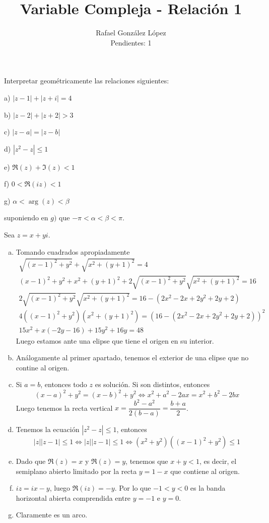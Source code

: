 \documentclass[twoside]{article}
\begin{document}
\title{Variable Compleja - Relación 1}
\author{Rafael González López\\
Pendientes: 1}
\maketitle

\begin{ejercicio}{1}
Interpretar geométricamente las relaciones siguientes:
  \begin{AutoMultiColItemize}
  \item[a)] $|z-1|+|z+i|=4$
  \item[b)] $|z-2|+|z+2|>3$
  \item[c)] $|z-a|=|z-b|$
  \item[d)] $|z^2-z|\leq 1$
  \item[e)] $\Re(z)+\Im(z)<1$
  \item[f)] $0<\Re(iz)<1$
  \item[g)] $\alpha < \arg(z) < \beta$
  \end{AutoMultiColItemize}
suponiendo en $g)$ que $-\pi<\alpha<\beta<\pi$. 
\end{ejercicio}
\begin{solucion}
Sea $z=x+yi$. 
\begin{enumerate}[a)]
\item Tomando cuadrados apropiadamente
\begin{gather*}
\sqrt{(x-1)^2+y^2}+\sqrt{x^2+(y+1)^2}=4\\
(x-1)^2+y^2 + x^2+(y+1)^2 + 2\sqrt{(x-1)^2+y^2}\sqrt{x^2+(y+1)^2} = 16\\
2\sqrt{(x-1)^2+y^2}\sqrt{x^2+(y+1)^2} = 16 - (2 x^2 - 2 x + 2 y^2 + 2 y + 2)\\
4((x-1)^2+y^2)(x^2+(y+1)^2) = (16 - (2 x^2 - 2 x + 2 y^2 + 2 y + 2))^2\\
15 x^2 + x (-2 y - 16) + 15 y^2 + 16 y = 48	
\end{gather*}
Luego estamos ante una elipse que tiene el origen en su interior.
\item Análogamente al primer apartado, tenemos el exterior de una elipse que no contine al origen.
\item Si $a=b$, entonces todo $z$ es solución. Si son distintos, entonces
$$
(x-a)^2+y^2 = (x-b)^2 +y^2  \Leftrightarrow x^2+a^2-2ax = x^2+b^2 -2bx 
$$
Luego tenemos la recta vertical $x = \dfrac{b^2-a^2}{2(b-a)}=\dfrac{b+a}{2}$.
\item Tenemos la ecuación $|z^2-z|\leq 1$, entonces
$$
|z||z-1|\leq 1 \Leftrightarrow |z||z-1| \leq 1 \Leftrightarrow (x^2+y^2)((x-1)^2+y^2) \leq 1
$$
\item Dado que $\Re(z)=x$ y $\Re(z)=y$, tenemos que $x+y<1$, es decir, el semiplano abierto limitado por la recta $y=1-x$ que contiene al origen.
\item $iz= ix-y$, luego $\Re(iz)= -y$. Por lo que $-1<y<0$ es la banda horizontal abierta comprendida entre $y=-1$ e $y=0$.
\item Claramente es un arco.
\end{enumerate}
\end{solucion}
\end{document}
